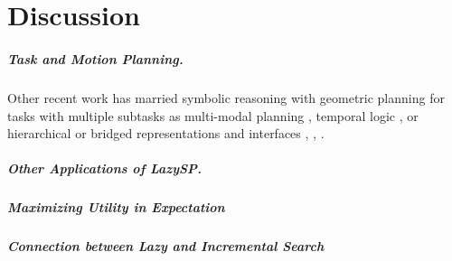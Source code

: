 \chapter{Discussion}


\paragraph{Task and Motion Planning.}
Other recent work has married symbolic reasoning with geometric planning
for tasks with multiple subtasks
as multi-modal planning \citep{hauser2010multi},
temporal logic \citep{bhatia2010temporalgoals},
or hierarchical or bridged representations and interfaces
\citep{cambon2009hybrid}, \citep{gravot2005asymov},
\citep{srivastava2014taskmotion}.

\paragraph{Other Applications of LazySP.}

\paragraph{Maximizing Utility in Expectation}

\paragraph{Connection between Lazy and Incremental Search}
